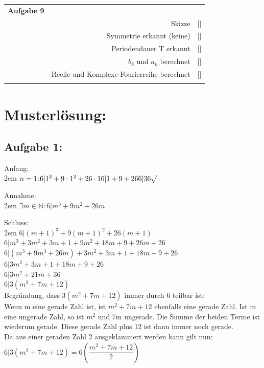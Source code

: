 \documentclass[11pt,final]{scrreprt}
\newcommand{\gbr} {\bigskip\\}
\newcommand{\N} {\mathbb N}
\begin{document}
\begin{tabular}{rrl}
\textbf{Aufgabe 9} &  &  \\ 
 & Skizze & [\hspace*{0.3cm}] \\ 
 & Symmetrie erkannt (keine) & [\hspace*{0.3cm}] \\ 
 & Periodendauer T erkannt & [\hspace*{0.3cm}] \\ 
 & $b_k$ und $a_k$ berechnet & [\hspace*{0.3cm}] \\ 
 & Reelle und Komplexe Fourierreihe berechnet & [\hspace*{0.3cm}] \gbr 
 &  &  \\ 
\end{tabular}

\newpage
\section*{Musterlösung:}

\subsection*{Aufgabe 1:}

Anfang:\\

\begingroup
\leftskip2em 
$n=1 \colon\\
6|1^3+9 \cdot 1^2 + 26 \cdot 1 \\
6|1+9+26\\
6|36 \surd \\
$
\par	
\endgroup 
 

Annahme:\\

\begingroup
\leftskip2em 
$ \exists m \in \N: 6|m^3+9m^2+26m $\\
\par	
\endgroup 

Schluss:\\

\begingroup
\leftskip2em 
$ 6|(m+1)^3+9(m+1)^2+26(m+1) $\\
$ 6| m^3+3m^2+3m+1+9m^2+18m+9+26m+26 $\\
$ 6|(m^3+9m^3+26m)+3m^2+3m+1+18m+9+26 $\\
$ 6|3m^2+3m+1+18m+9+26 $\\
$ 6|3m^2+21m+36 $\\
$ 6|3(m^2+7m+12) $\\
Begründung, dass $ 3(m^2+7m+12) $ immer durch 6 teilbar ist:\\
Wenn m eine gerade Zahl ist, ist $m^2+7m+12$ ebenfalls eine gerade Zahl. Ist m eine ungerade Zahl, so ist $m^2$ und 7m ungerade. Die Summe der beiden Terme ist wiederum gerade. Diese gerade Zahl plus 12 ist dann immer noch gerade.\\
Da aus einer geraden Zahl 2 ausgeklammert werden kann gilt nun:\\
$6 | 3 (m^2+7m+12) = 6 \left( \dfrac{m^2+7m+12}{2} \right)$\\
\par	
\endgroup 
\end{document}
